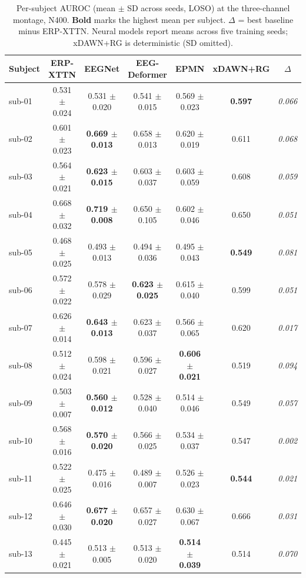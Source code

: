 \begin{table}[t]
\centering
\caption{Per-subject AUROC (mean $\pm$ SD across seeds, LOSO) at the three-channel montage, N400. \textbf{Bold} marks the highest mean per subject. $\Delta$ = best baseline minus ERP-XTTN. Neural models report means across five training seeds; xDAWN+RG is deterministic (SD omitted).}
\label{sup:tab-persubj-n400}
\begin{tabular}{lcccccc}
\toprule
Subject & ERP-XTTN & EEGNet & EEG-Deformer & EPMN & xDAWN+RG & $\Delta$ \\
\midrule
sub-01 & 0.531 $\pm$ 0.024 & 0.531 $\pm$ 0.020 & 0.541 $\pm$ 0.015 & 0.569 $\pm$ 0.023 & \textbf{0.597} & \textit{0.066} \\
sub-02 & 0.601 $\pm$ 0.023 & \textbf{0.669 $\pm$ 0.013} & 0.658 $\pm$ 0.013 & 0.620 $\pm$ 0.019 & 0.611 & \textit{0.068} \\
sub-03 & 0.564 $\pm$ 0.021 & \textbf{0.623 $\pm$ 0.015} & 0.603 $\pm$ 0.037 & 0.603 $\pm$ 0.059 & 0.608 & \textit{0.059} \\
sub-04 & 0.668 $\pm$ 0.032 & \textbf{0.719 $\pm$ 0.008} & 0.650 $\pm$ 0.105 & 0.602 $\pm$ 0.046 & 0.650 & \textit{0.051} \\
sub-05 & 0.468 $\pm$ 0.025 & 0.493 $\pm$ 0.013 & 0.494 $\pm$ 0.036 & 0.495 $\pm$ 0.043 & \textbf{0.549} & \textit{0.081} \\
sub-06 & 0.572 $\pm$ 0.022 & 0.578 $\pm$ 0.029 & \textbf{0.623 $\pm$ 0.025} & 0.615 $\pm$ 0.040 & 0.599 & \textit{0.051} \\
sub-07 & 0.626 $\pm$ 0.014 & \textbf{0.643 $\pm$ 0.013} & 0.623 $\pm$ 0.037 & 0.566 $\pm$ 0.065 & 0.620 & \textit{0.017} \\
sub-08 & 0.512 $\pm$ 0.024 & 0.598 $\pm$ 0.021 & 0.596 $\pm$ 0.027 & \textbf{0.606 $\pm$ 0.021} & 0.519 & \textit{0.094} \\
sub-09 & 0.503 $\pm$ 0.007 & \textbf{0.560 $\pm$ 0.012} & 0.528 $\pm$ 0.040 & 0.514 $\pm$ 0.046 & 0.549 & \textit{0.057} \\
sub-10 & 0.568 $\pm$ 0.016 & \textbf{0.570 $\pm$ 0.020} & 0.566 $\pm$ 0.025 & 0.534 $\pm$ 0.037 & 0.547 & \textit{0.002} \\
sub-11 & 0.522 $\pm$ 0.025 & 0.475 $\pm$ 0.016 & 0.489 $\pm$ 0.007 & 0.526 $\pm$ 0.023 & \textbf{0.544} & \textit{0.021} \\
sub-12 & 0.646 $\pm$ 0.030 & \textbf{0.677 $\pm$ 0.020} & 0.657 $\pm$ 0.027 & 0.630 $\pm$ 0.067 & 0.666 & \textit{0.031} \\
sub-13 & 0.445 $\pm$ 0.021 & 0.513 $\pm$ 0.005 & 0.513 $\pm$ 0.020 & \textbf{0.514 $\pm$ 0.039} & 0.514 & \textit{0.070} \\

\end{tabular}
\end{table}
